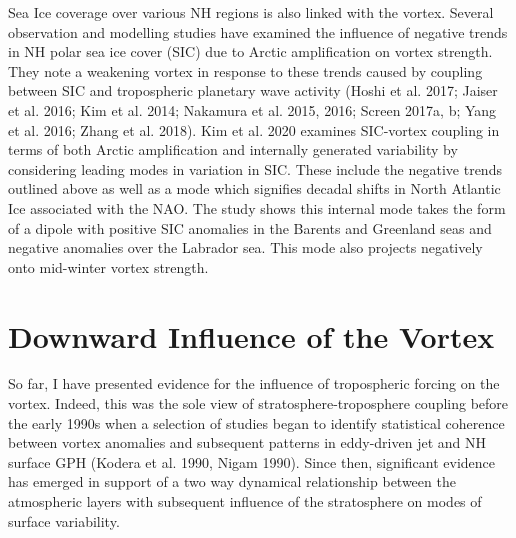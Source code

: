Sea Ice coverage over various NH regions is also linked with the vortex. Several observation and modelling studies have examined the influence of negative trends in NH polar sea ice cover (SIC) due to Arctic amplification on vortex strength. They note a weakening vortex in response to these trends caused by coupling between SIC and tropospheric planetary wave activity (Hoshi et al. 2017; Jaiser et al. 2016; Kim et al. 2014; Nakamura et al. 2015, 2016; Screen 2017a, b; Yang et al. 2016; Zhang et al. 2018). Kim et al. 2020 examines SIC-vortex coupling in terms of both Arctic amplification and internally generated variability by considering leading modes in variation in SIC. These include the negative trends outlined above as well as a mode which signifies decadal shifts in North Atlantic Ice associated with the NAO. The study shows this internal mode takes the form of a dipole with positive SIC anomalies in the Barents and Greenland seas and negative anomalies over the Labrador sea. This mode also projects negatively onto mid-winter vortex strength. 

\section{Downward Influence of the Vortex}
So far, I have presented evidence for the influence of tropospheric forcing on the vortex. Indeed, this was the sole view of stratosphere-troposphere coupling before the early 1990s when a selection of studies began to identify statistical coherence between vortex anomalies and subsequent patterns in eddy-driven jet and NH surface GPH (Kodera et al. 1990, Nigam 1990). Since then, significant evidence has emerged in support of a two way dynamical relationship between the atmospheric layers with subsequent influence of the stratosphere on modes of surface variability.

